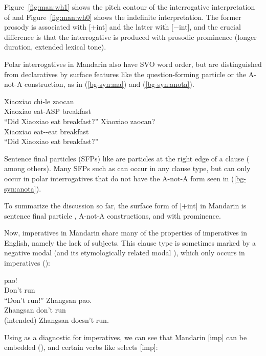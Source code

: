  Figure~\ref{fig:man:wh1} shows the pitch contour of the interrogative interpretation of \twh{} and Figure~\ref{fig:man:wh0} shows the indefinite interpretation. The former prosody is associated with [+int] and the latter with [$-$int], and the crucial difference is that the interrogative  is produced with prosodic prominence (longer duration, extended lexical tone). 

Polar interrogatives in Mandarin also have SVO word order, but are distinguished from declaratives by surface features like the question-forming particle  or the A-not-A construction, as in (\ref{bg-syn:ma}) and (\ref{bg-syn:anota}).

\gll Xiaoxiao	chi-le	zaocan		\\
Xiaoxiao	eat-ASP	breakfast	\Sfp{}\\
``Did Xiaoxiao eat breakfast?''
\eex
{}
\gll Xiaoxiao		zaocan?\\
	Xiaoxiao	eat-\Neg-eat	breakfast\\
	``Did Xiaoxiao eat breakfast?''
\eex


Sentence final particles (SFPs) like \ma{} are  particles at the right edge of a clause (\citealt{chao1968, zhudexi, huang1982, cheng1991, liboya2006} among others). Many SFPs such as  can occur in any clause type, but \ma{} can only occur in polar interrogatives that do not have the A-not-A form seen in (\ref{bg-syn:anota}). 




To summarize the discussion so far, the surface form of [+int] in Mandarin is sentence final particle \ma{}, A-not-A constructions, and \twh{} with prominence. 

Now, imperatives in Mandarin share many of the properties of imperatives in English, namely the lack of subjects. This clause type is sometimes marked by a negative modal  (and its etymologically related modal ), which only occurs in imperatives (\cite{chao1968, lithompson}):

\gll {} pao!\\
Don't run\\
``Don't run!''
\ex 
\gll *Zhangsan  pao.\\
Zhangsan don't run\\
(intended) Zhangsan doesn't run.
\exl
\eex 

Using  as a diagnostic for imperatives, we can see that Mandarin [imp] can be embedded (\cite{lithompson, chen2005imp}), and certain verbs like  selects [imp]:

